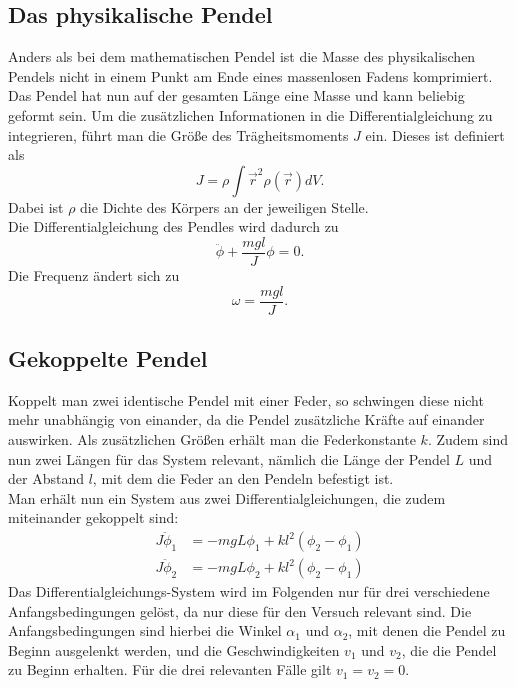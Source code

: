 \subsection{Das physikalische Pendel}
Anders als bei dem mathematischen Pendel ist die Masse des physikalischen Pendels nicht in einem Punkt am Ende eines massenlosen Fadens komprimiert.
Das Pendel hat nun auf der gesamten Länge eine Masse und kann beliebig geformt sein. Um die zusätzlichen Informationen in die Differentialgleichung
zu integrieren, führt man die Größe des Trägheitsmoments $J$ ein. Dieses ist definiert als
\begin{equation}
    J=\rho\int{\vec{r}^2\rho(\vec{r})dV}.
\end{equation}
Dabei ist $\rho$ die Dichte des Körpers an der jeweiligen Stelle.
\\
Die Differentialgleichung des Pendles wird dadurch zu
\begin{equation}
    \ddot{\phi}+\frac{mgl}{J}\phi=0.
\end{equation}
Die Frequenz ändert sich zu
\begin{equation}
    \omega=\frac{mgl}{J}.
\end{equation}

\subsection{Gekoppelte Pendel}
Koppelt man zwei identische Pendel mit einer Feder, so schwingen diese nicht mehr unabhängig von einander, da die Pendel zusätzliche Kräfte auf
einander auswirken. Als zusätzlichen Größen erhält man die Federkonstante $k$. Zudem sind nun zwei Längen für das System relevant, nämlich die
Länge der Pendel $L$ und der Abstand $l$, mit dem die Feder an den Pendeln befestigt ist.
\\
Man erhält nun ein System aus zwei Differentialgleichungen, die zudem miteinander gekoppelt sind:
\begin{align}
    J\ddot{\phi}_1&=-mgL\phi_1+kl^2(\phi_2-\phi_1)\\
    J\ddot{\phi}_2&=-mgL\phi_2+kl^2(\phi_2-\phi_1)
\end{align}
Das Differentialgleichungs-System wird im Folgenden nur für drei verschiedene Anfangsbedingungen gelöst, da nur diese für den Versuch relevant sind.
Die Anfangsbedingungen sind hierbei die Winkel $\alpha_1$ und $\alpha_2$, mit denen die Pendel zu Beginn ausgelenkt werden, und die Geschwindigkeiten
$v_1$ und $v_2$, die die Pendel zu Beginn erhalten. Für die drei relevanten Fälle gilt $v_1=v_2=0$.

